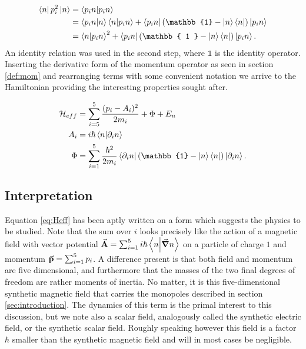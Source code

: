 \documentclass[a4paper]{article}
\begin{document}
\begin{align*}
        \bra{n} p_i^2\ket{n} &= \bra{p_i n} \ket{p_i n}\\
                                                 &=
                                                 \bra{p_i
                                                 n}\ket{n}\bra{n}\ket{p_i n}
                                                 + \bra{p_i n} (\mathbb{1} - \ket{n}
                                                 \bra{n}) \ket{p_i n}\\
                                                 &= \bra{n}\ket{p_i n}^2 +
                                                         \bra{p_i n} (\mathbb{ 1 } -
                                                         \ket{n}\bra{n})\ket{p_i
                                                         n}
.\end{align*}
An identity relation was used in the second step, where \(\mathbb{1}\) is the identity
operator.
Inserting the derivative form of the momentum operator as seen in section \ref{def:mom}
and rearranging terms with some convenient notation we arrive to the Hamiltonian providing the interesting properties
sought after.

\begin{align}\label{eq:Heff}
        \mathbb{\cal H}_{eff} &= \sum_{i=5}^{5} \frac{(p_i - A_i)^2}{2m_i} + \Phi + E_n\\
        A_i &= i\hbar{}\bra{n}\ket{\partial_i n}\\
        \Phi &= \sum_{i=1}^{5} \frac{\hbar{}^{2}}{2m_i}\bra{\partial_i n}(\mathbb{1} - \ket{n}
    \bra{n})\ket{\partial_i n}
.\end{align}
\subsection{Interpretation}
Equation \ref{eq:Heff} has been aptly written on a form which suggests the physics to be
studied. Note that the sum over \(i\) looks precisely like the action of a magnetic field
with vector potential \(\va{A} = \sum_{i=1}^{5} i\hbar{}\bra{n}\ket{\grad n}\) on a particle of charge
\(1\) and momentum \(\va{p} = \sum_{i=1}^{5} p_i\). A difference present is that both field and momentum are five dimensional, and
furthermore that the masses of the two final degrees of freedom are rather moments of
inertia. No matter, it is this five-dimensional synthetic magnetic field that carries the
monopoles described in section \ref{sec:introduction}. The dynamics of this term is the
primal interest to this discussion, but we note also a scalar field, analogously called the
synthetic electric field, or the synthetic scalar field. Roughly speaking however this
field is a factor \(\hbar{}\) smaller than the synthetic magnetic field and will in most
cases be negligible. 
\end{document}
